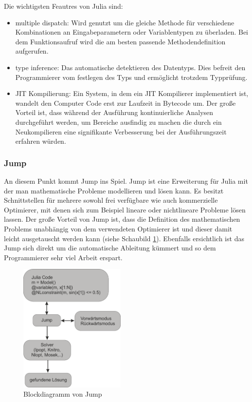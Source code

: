 \documentclass{like}
\begin{document}
Die wichtigsten Feautres von Julia sind:
\begin{itemize}

	\item multiple dispatch: Wird genutzt um die gleiche Methode für verschiedene Kombinationen an Eingabeparametern oder Variablentypen zu überladen. Bei dem Funktionsaufruf wird die am besten passende Methodendefinition aufgerufen. \\
	\item type inference: Das automatische detektieren des Datentyps. Dies befreit den Programmierer vom festlegen des Typs und ermöglicht trotzdem Typprüfung. \\
	\item \ac{JIT} Kompilierung: Ein System, in dem ein \ac{JIT} Kompilierer implementiert ist, wandelt den Computer Code erst zur Laufzeit in Bytecode um. Der große Vorteil ist, dass während der Ausführung kontinuierliche Analysen durchgeführt werden, um Bereiche ausfindig zu machen die durch ein Neukompilieren eine signifikante Verbesserung bei der Ausführungszeit erfahren würden. \\
\end{itemize}

\subsubsection*{Jump}
An diesem Punkt kommt Jump ins Spiel. Jump ist eine Erweiterung für Julia mit der man mathematische Probleme modellieren und lösen kann. Es besitzt Schnittstellen für mehrere sowohl frei verfügbare wie auch kommerzielle Optimierer, mit denen sich zum Beispiel lineare oder nichtlineare Probleme lösen lassen. Der große Vorteil von Jump ist, dass die Definition des mathematischen Problems unabhängig von dem verwendeten Optimierer ist und dieser damit leicht ausgetauscht werden kann (siehe Schaubild \ref{fig:jumpDiagram}). Ebenfalls ersichtlich ist das Jump sich direkt um die automatische Ableitung kümmert und so dem Programmierer sehr viel Arbeit erspart. 

\begin{figure}[ht!]
	\centering
	\includegraphics[width=150pt]{Abbildungen/jumpDiagram.png}
	\caption{Blockdiagramm von Jump}
	\label{fig:jumpDiagram}
\end{figure}
\end{document}
